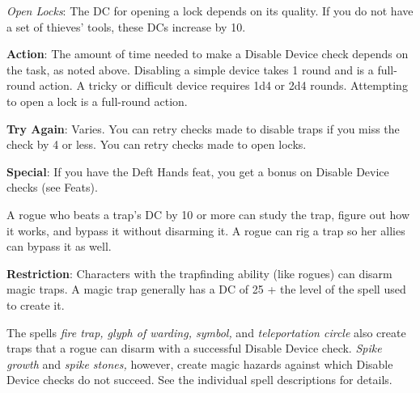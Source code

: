 \textit{Open Locks}: The DC for opening a lock depends on its quality. If you do not have a set of thieves' tools, these DCs increase by 10.
				
\textbf{Action}: The amount of time needed to make a Disable Device check depends on the task, as noted above. Disabling a simple device takes 1 round and is a full-round action. A tricky or difficult device requires 1d4 or 2d4 rounds. Attempting to open a lock is a full-round action.
				
\textbf{Try Again}: Varies. You can retry checks made to disable traps if you miss the check by 4 or less. You can retry checks made to open locks.
				
\textbf{Special}: If you have the Deft Hands feat, you get a bonus on Disable Device checks (see Feats).
				
A rogue who beats a trap's DC by 10 or more can study the trap, figure out how it works, and bypass it without disarming it. A rogue can rig a trap so her allies can bypass it as well.
				
\textbf{Restriction}: Characters with the trapfinding ability (like rogues) can disarm magic traps. A magic trap generally has a DC of 25 + the level of the spell used to create it.
				
The spells \textit{fire trap, glyph of warding, symbol, }and \textit{teleportation circle }also create traps that a rogue can disarm with a successful Disable Device check. \textit{Spike growth }and \textit{spike stones, }however, create magic hazards against which Disable Device checks do not succeed. See the individual spell descriptions for details.
        	
